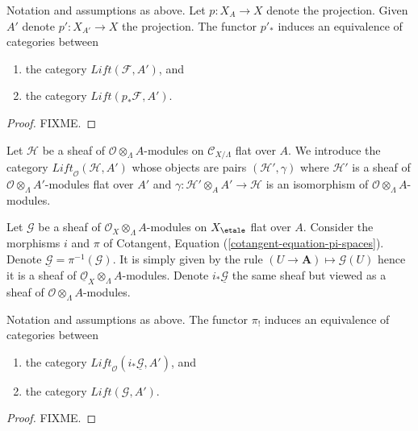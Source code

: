 \begin{lemma}
\label{lemma-equivalence}
Notation and assumptions as above. Let $p : X_A \to X$ denote the projection.
Given $A'$ denote $p' : X_{A'} \to X$ the projection. The functor $p'_*$
induces an equivalence of categories between
\begin{enumerate}
\item the category $\textit{Lift}(\mathcal{F}, A')$, and
\item the category $\textit{Lift}(p_*\mathcal{F}, A')$.
\end{enumerate}
\end{lemma}

\begin{proof}
FIXME.
\end{proof}

\noindent
Let $\mathcal{H}$ be a sheaf of $\mathcal{O} \otimes_\Lambda A$-modules
on $\mathcal{C}_{X/\Lambda}$ flat over $A$. We introduce the category
$\textit{Lift}_\mathcal{O}(\mathcal{H}, A')$
whose objects are pairs $(\mathcal{H}', \gamma)$ where $\mathcal{H}'$
is a sheaf of $\mathcal{O} \otimes_\Lambda A'$-modules flat over $A'$
and $\gamma : \mathcal{H}' \otimes_A A' \to \mathcal{H}$
is an isomorphism of $\mathcal{O} \otimes_\Lambda A$-modules.

\medskip\noindent
Let $\mathcal{G}$ be a sheaf of $\mathcal{O}_X \otimes_\Lambda A$-modules
on $X_\etale$ flat over $A$.
Consider the morphisms $i$ and $\pi$ of
Cotangent, Equation (\ref{cotangent-equation-pi-spaces}).
Denote $\underline{\mathcal{G}} = \pi^{-1}(\mathcal{G})$. It is
simply given by the rule $(U \to \mathbf{A}) \mapsto \mathcal{G}(U)$
hence it is a sheaf of $\underline{\mathcal{O}}_X \otimes_\Lambda A$-modules.
Denote $i_*\underline{\mathcal{G}}$ the same sheaf but viewed as a
sheaf of $\mathcal{O} \otimes_\Lambda A$-modules.

\begin{lemma}
\label{lemma-second-equivalence}
Notation and assumptions as above.
The functor $\pi_!$ induces an equivalence of categories between
\begin{enumerate}
\item the category
$\textit{Lift}_\mathcal{O}(i_*\underline{\mathcal{G}}, A')$, and
\item the category $\textit{Lift}(\mathcal{G}, A')$.
\end{enumerate}
\end{lemma}

\begin{proof}
FIXME.
\end{proof}


